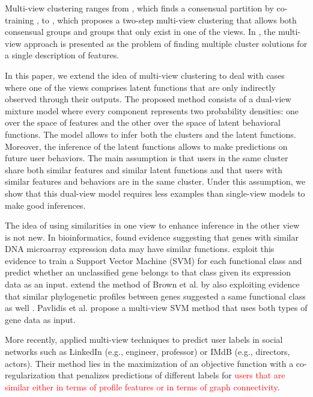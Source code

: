\documentclass[smallextended]{svjour3}          %
\newcommand\alberto[1]{\textcolor{red}{#1}}
\begin{document}
Multi-view clustering ranges from \cite{Kumar2011}, which finds a consensual partition by co-training \citep{Mitchell1998}, to \cite{Greene2009a}, which proposes a two-step multi-view clustering that allows both consensual groups and groups that only exist in one of the views. In \cite{Niu2012}, the multi-view approach is presented as the problem of finding multiple cluster solutions for a single description of features.

In this paper, we extend the idea of multi-view clustering to deal with cases where one of the views comprises latent functions that are only indirectly observed through their outputs. The proposed method consists of a dual-view mixture model where every component represents two probability densities: one over the space of features and the other over the space of latent behavioral functions. The model allows to infer both the clusters and the latent functions.  Moreover, the inference of the latent functions allows to make predictions on future user behaviors. The main assumption is that users in the same cluster share both similar features and similar latent functions and that users with similar features and behaviors are in the same cluster. Under this assumption, we show that this dual-view model requires less examples than single-view models to make good inferences.



The idea of using similarities in one view to enhance inference in the other view is not new. In bioinformatics, \cite{Eisen1998} found evidence suggesting that genes with similar DNA microarray expression data may have similar functions. \cite{Brown2000} exploit this evidence to train a Support Vector Machine (SVM) for each functional class and predict whether an unclassified gene belongs to that class given its expression data as an input. \cite{Pavlidis2002} extend the method of Brown et al. by also exploiting evidence that similar phylogenetic profiles between genes suggested a same functional class as well \citep{Pellegrini1999a}. Pavlidis et al. propose a multi-view SVM method that uses both types of gene data as input.

More recently, \cite{Cheng2014} applied multi-view techniques to predict user labels in social networks such as LinkedIn (e.g., engineer, professor) or IMdB (e.g., directors, actors). Their method lies in the maximization of an objective function with a co-regularization that penalizes predictions of different labels for \alberto{users that are similar either in terms of profile features or in terms of graph connectivity}.
\end{document}

